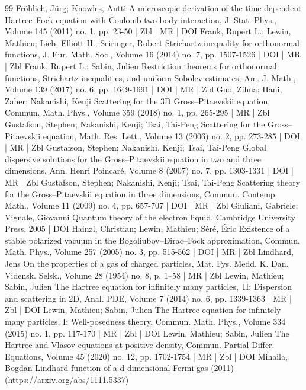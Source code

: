 \begin{thebibliography}{99}
Fröhlich, Jürg; Knowles, Antti A microscopic derivation of the time-dependent Hartree–Fock equation with Coulomb two-body interaction, J. Stat. Phys., Volume 145 (2011) no. 1, pp. 23-50 | Zbl | MR | DOI
Frank, Rupert L.; Lewin, Mathieu; Lieb, Elliott H.; Seiringer, Robert Strichartz inequality for orthonormal functions, J. Eur. Math. Soc., Volume 16 (2014) no. 7, pp. 1507-1526 | DOI | MR | Zbl
Frank, Rupert L.; Sabin, Julien Restriction theorems for orthonormal functions, Strichartz inequalities, and uniform Sobolev estimates, Am. J. Math., Volume 139 (2017) no. 6, pp. 1649-1691 | DOI | MR | Zbl
Guo, Zihua; Hani, Zaher; Nakanishi, Kenji Scattering for the 3D Gross–Pitaevskii equation, Commun. Math. Phys., Volume 359 (2018) no. 1, pp. 265-295 | MR | Zbl
Gustafson, Stephen; Nakanishi, Kenji; Tsai, Tai-Peng Scattering for the Gross–Pitaevskii equation, Math. Res. Lett., Volume 13 (2006) no. 2, pp. 273-285 | DOI | MR | Zbl
Gustafson, Stephen; Nakanishi, Kenji; Tsai, Tai-Peng Global dispersive solutions for the Gross–Pitaevskii equation in two and three dimensions, Ann. Henri Poincaré, Volume 8 (2007) no. 7, pp. 1303-1331 | DOI | MR | Zbl
Gustafson, Stephen; Nakanishi, Kenji; Tsai, Tai-Peng Scattering theory for the Gross–Pitaevskii equation in three dimensions, Commun. Contemp. Math., Volume 11 (2009) no. 4, pp. 657-707 | DOI | MR | Zbl
Giuliani, Gabriele; Vignale, Giovanni Quantum theory of the electron liquid, Cambridge University Press, 2005 | DOI
Hainzl, Christian; Lewin, Mathieu; Séré, Éric Existence of a stable polarized vacuum in the Bogoliubov–Dirac–Fock approximation, Commun. Math. Phys., Volume 257 (2005) no. 3, pp. 515-562 | DOI | MR | Zbl
Lindhard, Jens On the properties of a gas of charged particles, Mat. Fys. Medd. K. Dan. Vidensk. Selsk., Volume 28 (1954) no. 8, p. 1--58 | MR | Zbl
Lewin, Mathieu; Sabin, Julien The Hartree equation for infinitely many particles, II: Dispersion and scattering in 2D, Anal. PDE, Volume 7 (2014) no. 6, pp. 1339-1363 | MR | Zbl | DOI
Lewin, Mathieu; Sabin, Julien The Hartree equation for infinitely many particles, I: Well-posedness theory, Commun. Math. Phys., Volume 334 (2015) no. 1, pp. 117-170 | MR | Zbl | DOI
Lewin, Mathieu; Sabin, Julien The Hartree and Vlasov equations at positive density, Commun. Partial Differ. Equations, Volume 45 (2020) no. 12, pp. 1702-1754 | MR | Zbl | DOI
Mihaila, Bogdan Lindhard function of a d-dimensional Fermi gas (2011) (https://arxiv.org/abs/1111.5337)

\end{thebibliography}
